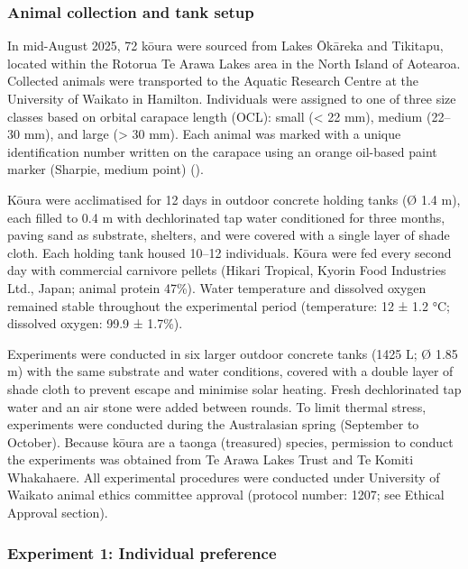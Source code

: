 \documentclass[
  letterpaper,
  DIV=11,
  numbers=noendperiod]{scrartcl}
\begin{document}
\subsubsection{Animal collection and tank
setup}\label{animal-collection-and-tank-setup}

In mid-August 2025, 72 kōura were sourced from Lakes Ōkāreka and
Tikitapu, located within the Rotorua Te Arawa Lakes area in the North
Island of Aotearoa. Collected animals were transported to the Aquatic
Research Centre at the University of Waikato in Hamilton. Individuals
were assigned to one of three size classes based on orbital carapace
length (OCL): small (\textless{} 22 mm), medium (22--30 mm), and large
(\textgreater{} 30 mm). Each animal was marked with a unique
identification number written on the carapace using an orange oil-based
paint marker (Sharpie, medium point) ().

Kōura were acclimatised for 12 days in outdoor concrete holding tanks (Ø
1.4 m), each filled to 0.4 m with dechlorinated tap water conditioned
for three months, paving sand as substrate, shelters, and were covered
with a single layer of shade cloth. Each holding tank housed 10--12
individuals. Kōura were fed every second day with commercial carnivore
pellets (Hikari Tropical, Kyorin Food Industries Ltd., Japan; animal
protein 47\%). Water temperature and dissolved oxygen remained stable
throughout the experimental period (temperature: 12 ± 1.2 °C; dissolved
oxygen: 99.9 ± 1.7\%).

Experiments were conducted in six larger outdoor concrete tanks (1425 L;
Ø 1.85 m) with the same substrate and water conditions, covered with a
double layer of shade cloth to prevent escape and minimise solar
heating. Fresh dechlorinated tap water and an air stone were added
between rounds. To limit thermal stress, experiments were conducted
during the Australasian spring (September to October). Because kōura are
a taonga (treasured) species, permission to conduct the experiments was
obtained from Te Arawa Lakes Trust and Te Komiti Whakahaere. All
experimental procedures were conducted under University of Waikato
animal ethics committee approval (protocol number: 1207; see Ethical
Approval section).

\subsubsection{Experiment 1: Individual
preference}\label{experiment-1-individual-preference}
\end{document}
